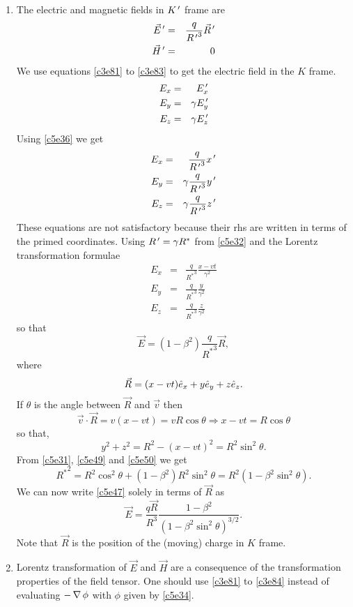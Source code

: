 \begin{enumerate}
\item The electric and magnetic fields in $K^{\,\prime}$ frame are
\begin{eqnarray}
\vec{E}^{\,\prime} &=& \frac{q}{{R^{\,\prime}}^3}\vec{R}^{\,\prime} \label{c5e36} \\
\vec{H}^{\,\prime} &=& 0 \label{c5e37}
\end{eqnarray}
We use equations \eqref{c3e81} to \eqref{c3e83} to get the electric field in the
$K$ frame.
\begin{eqnarray}
E_x &=& E_x^{\,\prime} \label{c5e38} \\
E_y &=& \gamma E_y^{\,\prime} \label{c5e39} \\
E_z &=& \gamma E_z^{\,\prime} \label{c5e40}
\end{eqnarray}
Using \eqref{c5e36} we get
\begin{eqnarray}
E_x &=& \frac{q}{{R^{\,\prime}}^3}x^{\,\prime} \label{c5e41} \\
E_y &=& \gamma\frac{q}{{R^{\,\prime}}^3}y^{\,\prime} \label{c5e42} \\
E_z &=& \gamma\frac{q}{{R^{\,\prime}}^3}z^{\,\prime} \label{c5e43}
\end{eqnarray}
These equations are not satisfactory because their rhs are written in terms of
the primed coordinates. Using $R^{\,\prime} = \gamma R^\ast$ from \eqref{c5e32} and the
Lorentz transformation formulae
\begin{eqnarray}
E_x &=& \frac{q}{{R^\ast}^3}\frac{x - vt}{\gamma^2} \label{c5e44} \\
E_y &=& \frac{q}{{R^\ast}^3}\frac{y}{\gamma^2} \label{c5e45} \\
E_z &=& \frac{q}{{R^\ast}^3}\frac{z}{\gamma^2} \label{c5e46}
\end{eqnarray}
so that
\begin{equation}\label{c5e47}
\vec{E} = (1 - \beta^2)\frac{q}{{R^\ast}^3}\vec{R},
\end{equation}
where
\begin{equation}\label{c5e48}
\vec{R} = (x - vt)\hat{e}_{x} + y\hat{e}_{y} + z\hat{e}_{z}.
\end{equation}
If $\theta$ is the angle between $\vec{R}$ and $\vec{v}$ then
\begin{equation}\label{c5e49}
\vec{v}\cdot\vec{R} = v(x - vt) = vR\cos\theta \Rightarrow x - vt = R\cos\theta
\end{equation}
so that,
\begin{equation}\label{c5e50}
y^2 + z^2 = R^2 - (x - vt)^2 = R^2\sin^2\theta.
\end{equation}
From \eqref{c5e31}, \eqref{c5e49} and \eqref{c5e50} we get
\begin{equation}\label{c5e51}
{R^\ast}^2 = R^2\cos^2\theta + (1 - \beta^2)R^2\sin^2\theta = 
R^2(1 - \beta^2\sin^2\theta).
\end{equation}
We can now write \eqref{c5e47} solely in terms of $\vec{R}$ as
\begin{equation}\label{c5e52}
\vec{E} = \frac{q\vec{R}}{R^3}\frac{1 - \beta^2}{(1 - \beta^2\sin^2\theta)^{3/2}}.
\end{equation}
Note that $\vec{R}$ is the position of the (moving) charge in $K$ frame.

\item Lorentz transformation of $\vec{E}$ and $\vec{H}$ are a consequence of the
transformation properties of the field tensor. One should use \eqref{c3e81} to
\eqref{c3e84} instead of evaluating $-\operatorname{\nabla}\phi$ with $\phi$ given by \eqref{c5e34}.
\end{enumerate}